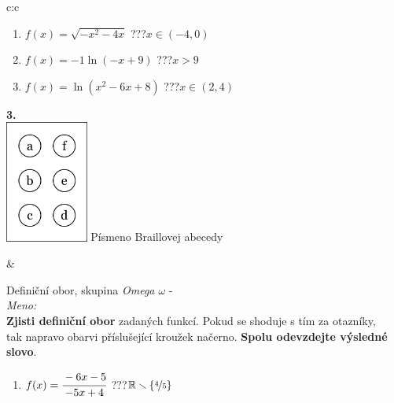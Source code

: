 \documentclass[10pt]{report}
\begin{document}
\begin{tabular}{c:c}
\begin{minipage}[c][99mm][t]{0.49\linewidth}
\begin{center}
\begin{minipage}{0.77\linewidth}
\begin{center}
\begin{varwidth}{\textwidth}
\begin{enumerate}
\item $f(x)=\sqrt{-x^2-4x}$\quad \dotfill\; ???\;\dotfill \quad $x\in(-4 , 0)$
\item $f(x)=-1\ln{(-x+9)}$\quad \dotfill\; ???\;\dotfill \quad $x>9$
\item $f(x)=\ln{(x^2-6x+8)}$\quad \dotfill\; ???\;\dotfill \quad $x\in(2 , 4)$
\end{enumerate}
\end{varwidth}
\end{center}
\end{minipage}
\begin{minipage}{0.20\linewidth}
\begin{center}
{\Huge\bfseries 3.} \\[2mm]
\includegraphics[height=40mm]{../images/braille.png}
{\small Písmeno Braillovej abecedy}
\end{center}
\end{minipage}
\end{center}
\end{minipage}
&
\begin{minipage}[c][99mm][t]{0.49\linewidth}
\begin{center}
\vspace{7mm}
{\huge Definiční obor, skupina \textit{Omega $\omega$} -}\\[4.5mm]
\textit{Meno:}\phantom{xxxxxxxxxxxxxxxxxxxxxxxxxxxxxxxxxxxxxxxxxxxxxxxxxxxxxxxxxxxxxxxxx}\\[3.5mm]
\textbf{Zjisti definiční obor} zadaných funkcí. Pokud se shoduje s tím za otazníky,\\tak napravo obarvi příslušející kroužek načerno. \textbf{Spolu odevzdejte výsledné slovo}.\\[3mm]
\begin{minipage}{0.77\linewidth}
\begin{center}
\begin{varwidth}{\textwidth}
\begin{enumerate}
\normalsize
\item $f(x)=\cfrac{-6x-5}{-5x+4}$\quad \dotfill\; ???\;\dotfill \quad $\mathbb{R}\smallsetminus\{\nicefrac{4}{5}\}$

\end{enumerate}
\end{varwidth}
\end{center}
\end{minipage}
\end{center}
\end{minipage}
\end{tabular}
\end{document}
